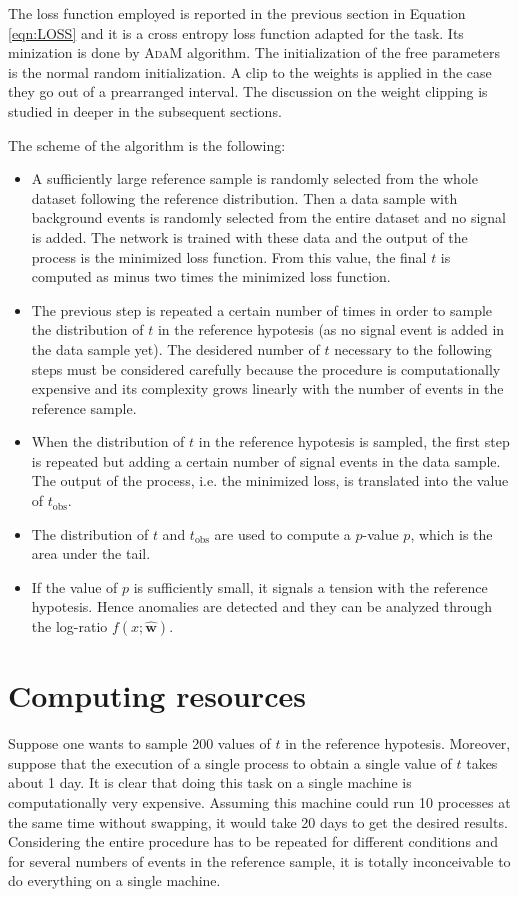 The loss function employed is reported in the previous section in Equation \ref{eqn:LOSS} and it is a cross entropy loss function adapted for the task. Its minization is done by \textsc{AdaM} algorithm. The initialization of the free parameters is the normal random initialization. A clip to the weights is applied in the case they go out of a prearranged interval. The discussion on the weight clipping is studied in deeper in the subsequent sections.

The scheme of the algorithm is the following:
\begin{itemize}
	\item A sufficiently large reference sample is randomly selected from the whole dataset following the reference distribution. Then a data sample with background events is randomly selected from the entire dataset and no signal is added. The network is trained with these data and the output of the process is the minimized loss function. From this value, the final $t$ is computed as minus two times the minimized loss function.
	\item The previous step is repeated a certain number of times in order to sample the distribution of $t$ in the reference hypotesis (as no signal event is added in the data sample yet). The desidered number of $t$ necessary to the following steps must be considered carefully because the procedure is computationally expensive and its complexity grows linearly with the number of events in the reference sample.
	\item When the distribution of $t$ in the reference hypotesis is sampled, the first step is repeated but adding a certain number of signal events in the data sample. The output of the process, i.e. the minimized loss, is translated into the value of $t_\mathrm{obs}$.
	\item The distribution of $t$ and $t_\mathrm{obs}$ are used to compute a $p$-value $p$, which is the area under the tail.
	\item If the value of $p$ is sufficiently small, it signals a tension with the reference hypotesis. Hence anomalies are detected and they can be analyzed through the log-ratio $f(x;\hat{\mathbf{w}})$.
\end{itemize}





\section{Computing resources}
Suppose one wants to sample 200 values of $t$ in the reference hypotesis. Moreover, suppose that the execution of a single process to obtain a single value of $t$ takes about 1 day. It is clear that doing this task on a single machine is computationally very expensive. Assuming this machine could run 10 processes at the same time without swapping, it would take 20 days to get the desired results. Considering the entire procedure has to be repeated for different conditions and for several numbers of events in the reference sample, it is totally inconceivable to do everything on a single machine.

